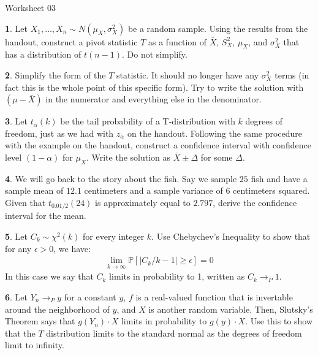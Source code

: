 \documentclass{tufte-handout}
\begin{document}
\justify

{\LARGE Worksheet 03}

\vspace*{18pt}


\textbf{1}. Let $X_1, \ldots, X_n \sim N(\mu_X, \sigma_X^2)$ be a random sample. Using
the results from the handout, construct a pivot statistic $T$ as a function
of $\bar{X}$, $S_X^2$, $\mu_X$, and $\sigma_X^2$ that has a distribution of
$t(n-1)$. Do not simplify.

\textbf{2}. Simplify the form of the $T$ statistic. It should no longer have any
$\sigma_X^2$ terms (in fact this is the whole point of this specific form). 
Try to write the solution with $(\mu - \bar{X})$ in the numerator and
everything else in the denominator.

\textbf{3}. Let $t_\alpha(k)$ be the tail probability of a T-distribution with $k$
degrees of freedom, just as we had with $z_\alpha$ on the handout. Following
the same procedure with the example on the handout, construct a confidence
interval with confidence level $(1 - \alpha)$ for $\mu_X$. Write the solution
as $\bar{X} \pm \Delta$ for some $\Delta$.

\textbf{4}. We will go back to the story about the fish. Say we sample $25$ fish and
have a sample mean of $12.1$ centimeters and a sample variance of $6$
centimeters squared. Given that $t_{0.01/2}(24)$ is approximately equal
to $2.797$, derive the confidence interval for the mean.


\textbf{5}. Let $C_k \sim \chi^2(k)$ for every integer $k$. Use Chebychev's Inequality to show
that for any $\epsilon > 0$, we have:
\begin{align*}
\lim_{k \rightarrow \infty} \mathbb{P} \left[ |C_k/k - 1| \geq \epsilon \right] = 0
\end{align*}
In this case we say that $C_k$ limits in probability to 1, written as
$C_k \rightarrow_P 1$.

\textbf{6}. Let $Y_n \rightarrow_P y$ for a constant $y$, $f$ is a real-valued function that
is invertable around the neighborhood of $y$, and $X$ is another random variable.
Then, Slutsky's Theorem says that $g(Y_n) \cdot X$ limits in probability to
$g(y) \cdot X$. Use this to show that the $T$ distribution limits to the standard
normal as the degrees of freedom limit to infinity.
\end{document}
